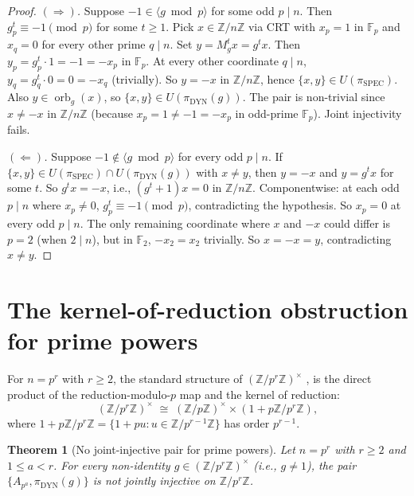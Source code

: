 \documentclass[11pt,reqno]{amsart}
\theoremstyle{plain}
\newtheorem{theorem}{Theorem}[section]
\theoremstyle{definition}
\theoremstyle{remark}
\DeclareMathOperator{\orb}{orb}
\DeclareMathOperator{\spec}{SPEC}
\DeclareMathOperator{\dyn}{DYN}
\newcommand{\Z}{\mathbb{Z}}
\newcommand{\F}{\mathbb{F}}
\begin{document}
\begin{proof}
\textit{$(\Rightarrow)$.} Suppose $-1 \in \langle g \bmod p \rangle$
for some odd $p \mid n$. Then $g_{p}^{t} \equiv -1 \pmod p$ for
some $t \ge 1$. Pick $x \in \Z/n\Z$ via CRT with $x_{p} = 1$ in
$\F_{p}$ and $x_{q} = 0$ for every other prime $q \mid n$. Set
$y = M_{g}^{t} x = g^{t} x$. Then $y_{p} = g_{p}^{t} \cdot 1 = -1
= -x_{p}$ in $\F_{p}$. At every other coordinate $q \mid n$,
$y_{q} = g_{q}^{t} \cdot 0 = 0 = -x_{q}$ (trivially). So $y = -x$
in $\Z/n\Z$, hence $\{x, y\} \in U(\pi_{\spec})$. Also $y \in
\orb_{g}(x)$, so $\{x, y\} \in U(\pi_{\dyn}(g))$. The pair is
non-trivial since $x \ne -x$ in $\Z/n\Z$ (because $x_{p} = 1
\ne -1 = -x_{p}$ in odd-prime $\F_{p}$). Joint injectivity fails.

\textit{$(\Leftarrow)$.} Suppose $-1 \notin \langle g \bmod p
\rangle$ for every odd $p \mid n$. If $\{x, y\} \in U(\pi_{\spec})
\cap U(\pi_{\dyn}(g))$ with $x \ne y$, then $y = -x$ and $y = g^{t} x$
for some $t$. So $g^{t} x = -x$, i.e., $(g^{t} + 1) x = 0$ in
$\Z/n\Z$. Componentwise: at each odd $p \mid n$ where $x_{p} \ne 0$,
$g_{p}^{t} \equiv -1 \pmod p$, contradicting the hypothesis. So
$x_{p} = 0$ at every odd $p \mid n$. The only remaining coordinate
where $x$ and $-x$ could differ is $p = 2$ (when $2 \mid n$), but in
$\F_{2}$, $-x_{2} = x_{2}$ trivially. So $x = -x = y$, contradicting
$x \ne y$.
\end{proof}

\section{The kernel-of-reduction obstruction for prime powers}\label{sec:pkernel}

For $n = p^{r}$ with $r \ge 2$, the standard structure of
$(\Z/p^{r}\Z)^{\times}$ \cite[\S I.3]{Neukirch1999},
\cite[\S 7.6]{DummitFoote2004} is the direct product of the
reduction-modulo-$p$ map and the kernel of reduction:
\begin{equation}\label{eq:prpunit-decomp}
  (\Z/p^{r}\Z)^{\times}
  \;\cong\;
  (\Z/p\Z)^{\times} \times (1 + p\Z/p^{r}\Z),
\end{equation}
where $1 + p\Z/p^{r}\Z = \{1 + p u : u \in \Z/p^{r-1}\Z\}$ has order
$p^{r-1}$.

\begin{theorem}[No joint-injective pair for prime powers]\label{thm:pkernel}
Let $n = p^{r}$ with $r \ge 2$ and $1 \le a < r$. For every
non-identity $g \in (\Z/p^{r}\Z)^{\times}$ (i.e., $g \ne 1$), the
pair $\{A_{p^{a}}, \pi_{\dyn}(g)\}$ is \emph{not} jointly injective
on $\Z/p^{r}\Z$.
\end{theorem}
\end{document}

